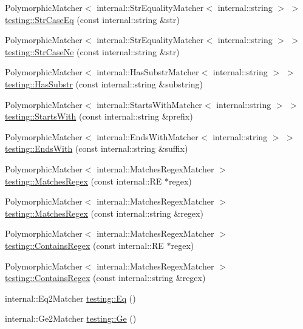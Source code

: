 \begin{DoxyCompactItemize}
\item 
Polymorphic\+Matcher$<$ internal\+::\+Str\+Equality\+Matcher$<$ internal\+::string $>$ $>$ \hyperlink{namespacetesting_addbdb8c0902ab09cade24fa6db7c0073}{testing\+::\+Str\+Case\+Eq} (const internal\+::string \&str)
\item 
Polymorphic\+Matcher$<$ internal\+::\+Str\+Equality\+Matcher$<$ internal\+::string $>$ $>$ \hyperlink{namespacetesting_a9596fd67bdd5df195bc54382f91a1906}{testing\+::\+Str\+Case\+Ne} (const internal\+::string \&str)
\item 
Polymorphic\+Matcher$<$ internal\+::\+Has\+Substr\+Matcher$<$ internal\+::string $>$ $>$ \hyperlink{namespacetesting_a7d27682e38d57eea81ba145a2772e1c7}{testing\+::\+Has\+Substr} (const internal\+::string \&substring)
\item 
Polymorphic\+Matcher$<$ internal\+::\+Starts\+With\+Matcher$<$ internal\+::string $>$ $>$ \hyperlink{namespacetesting_ae0502232432b1fe8361d296c6de6beda}{testing\+::\+Starts\+With} (const internal\+::string \&prefix)
\item 
Polymorphic\+Matcher$<$ internal\+::\+Ends\+With\+Matcher$<$ internal\+::string $>$ $>$ \hyperlink{namespacetesting_aec11c4e418a835ca2c0c3cbdb29b28ba}{testing\+::\+Ends\+With} (const internal\+::string \&suffix)
\item 
Polymorphic\+Matcher$<$ internal\+::\+Matches\+Regex\+Matcher $>$ \hyperlink{namespacetesting_a4dac232f315edc259b62ce88e413b107}{testing\+::\+Matches\+Regex} (const internal\+::\+RE $\ast$regex)
\item 
Polymorphic\+Matcher$<$ internal\+::\+Matches\+Regex\+Matcher $>$ \hyperlink{namespacetesting_afea6e0eaf0ae69b409fc1c0285df6c8c}{testing\+::\+Matches\+Regex} (const internal\+::string \&regex)
\item 
Polymorphic\+Matcher$<$ internal\+::\+Matches\+Regex\+Matcher $>$ \hyperlink{namespacetesting_a899838630a71376aa071dfd7c500f2ca}{testing\+::\+Contains\+Regex} (const internal\+::\+RE $\ast$regex)
\item 
Polymorphic\+Matcher$<$ internal\+::\+Matches\+Regex\+Matcher $>$ \hyperlink{namespacetesting_ad8efafa15630a8274f41f5e22f8f0e49}{testing\+::\+Contains\+Regex} (const internal\+::string \&regex)
\item 
internal\+::\+Eq2\+Matcher \hyperlink{namespacetesting_aa7771a34f092fd6f1dca2c82fb2a36a1}{testing\+::\+Eq} ()
\item 
internal\+::\+Ge2\+Matcher \hyperlink{namespacetesting_a8cc0a6519e30bedf52c6e53c71e18265}{testing\+::\+Ge} ()
\item 

\end{DoxyCompactItemize}
